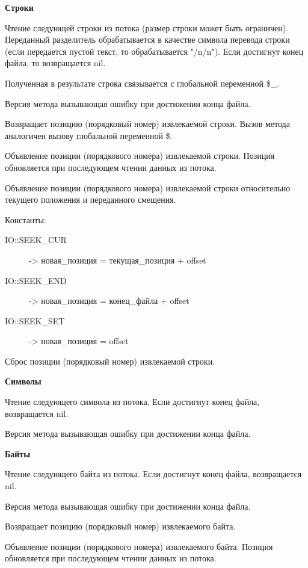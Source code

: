 {\bf Строки}

\begin{methodlist}
  Чтение следующей строки из потока (размер строки может быть ограничен). Переданный разделитель обрабатывается в качестве символа перевода строки (если передается пустой текст, то обрабатывается "/n/n"). Если достигнут конец файла, то возвращается nil.

  Полученная в результате строка связывается с глобальной переменной \$_. 
 
  Версия метода вызывающая ошибку при достижении конца файла. 
 
  Возвращает позицию (порядковый номер) извлекаемой строки. Вызов метода аналогичен вызову глобальной переменной \$. 
 
  Объявление позиции (порядкового номера) извлекаемой строки. Позиция обновляется при последующем чтении данных из потока.  
 
  Объявление позиции (порядкового номера) извлекаемой строки относительно текущего положения и переданного смещения.

  Константы:
  \begin{description}
    \item[IO::SEEK_CUR] -> новая_позиция = текущая_позиция + offset
    \item[IO::SEEK_END] -> новая_позиция = конец_файла + offset
    \item[IO::SEEK_SET] -> новая_позиция = offset
  \end{description}   

  Сброс позиции (порядковый номер) извлекаемой строки.
\end{methodlist}

{\bf Символы}

\begin{methodlist}
  Чтение следующего символа из потока. Если достигнут конец файла, возвращается nil.

  Версия метода вызывающая ошибку при достижении конца файла.
\end{methodlist}

{\bf Байты}

\begin{methodlist}
  Чтение следующего байта из потока. Если достигнут конец файла, возвращается nil. 
 
  Версия метода вызывающая ошибку при достижении конца файла. 
 
  Возвращает позицию (порядковый номер) извлекаемого байта. 
 
  Объявление позиции (порядкового номера) извлекаемого байта. Позиция обновляется при последующем чтении данных из потока.
\end{methodlist}

